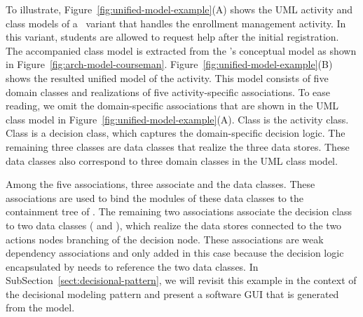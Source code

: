 To illustrate, Figure~\ref{fig:unified-model-example}(A) shows the UML activity and class models of a \courseman~variant that handles the enrollment management activity. In this variant, students are allowed to request help after the initial registration. The accompanied class model is extracted from the \courseman's conceptual model as shown in Figure~\ref{fig:arch-model-courseman}.
%
Figure~\ref{fig:unified-model-example}(B) shows the resulted unified model of the activity.
This model consists of five domain classes and realizations of five activity-specific associations. To ease reading, we omit the domain-specific associations that are shown in the UML class model in Figure~\ref{fig:unified-model-example}(A). Class  is the activity class. Class  is a decision class, which captures the domain-specific decision logic. The remaining three classes are data classes that realize the three data stores. These data classes also correspond to three domain classes in the UML class model. 

Among the five associations, three associate  and the data classes. These associations are used to bind the modules of these data classes to the containment tree of .
The remaining two associations associate the decision class  to two data classes ( and ), which realize the data stores connected to the two actions nodes branching of the decision node. These associations are weak dependency associations and only added in this case because the decision logic encapsulated by  needs to reference the two data classes.
%
In SubSection~\ref{sect:decisional-pattern}, we will revisit this example in the context of the decisional modeling pattern and present a software GUI that is generated from the model.
